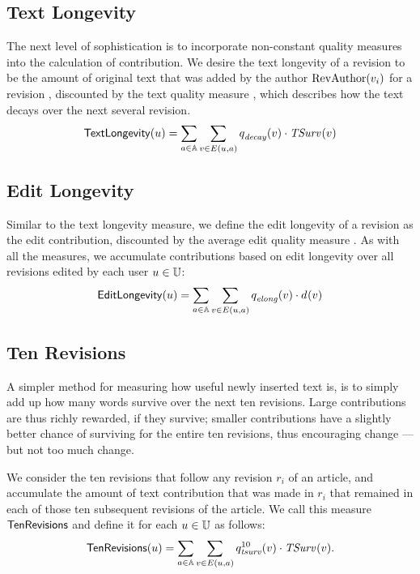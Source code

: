 \subsection{Text Longevity}

\noindent
The next level of sophistication is to incorporate
non-constant quality measures into the calculation of contribution.
We desire the text longevity of a revision to be
the amount of original text that was
added by the author $\mathrm{RevAuthor}(v_{i})$
for a revision , discounted by the
text quality measure , which describes
how the text decays over the next several revision.
%
\[
\mathsf{TextLongevity}(u) = 
\sum_{a \in \mathbb{A}} \sum_{v \in E(u, a)} q_\mathit{decay}^{}(v)
        \cdot \mathit{TSurv}_{}(v)
\]
%

\subsection{Edit Longevity}

\noindent
Similar to the text longevity measure, we define the edit longevity
of a revision  as the edit contribution, discounted by the 
average edit quality measure .
As with all the measures, we accumulate contributions based on 
edit longevity over all revisions edited by each user $u \in \mathbb{U}$:
%
\[
\mathsf{EditLongevity}(u) = \sum_{a \in \mathbb{A}} \sum_{v \in E(u, a)} 
q_\mathit{elong}^{}(v) \cdot d_{}(v)
\]
%

\subsection{Ten Revisions}

\noindent
A simpler method for measuring how useful newly inserted
text is, is to simply add up how many words survive over
the next ten revisions.
Large contributions are thus richly rewarded, if they survive;
smaller contributions have a slightly better chance of surviving
for the entire ten revisions, thus encouraging change ---
but not too much change.

We consider the ten revisions that follow any revision $r_i$ of an 
article, and accumulate the amount of text contribution that was made 
in $r_i$ that remained in each of those ten subsequent revisions
of the article.
We call this measure $\mathsf{TenRevisions}$ and define it for each
$u \in \mathbb{U}$ as follows:
%
\begin{gather*}
\mathsf{TenRevisions}(u) = 
\sum_{a \in \mathbb{A}} \sum_{v \in E(u, a)} q_\mathit{tsurv}^{10}(v)
        \cdot \mathit{TSurv}_{}(v).
\end{gather*}

